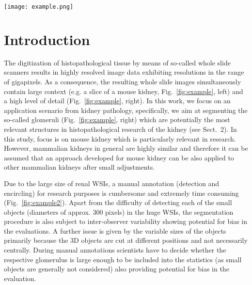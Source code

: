 \documentclass{elsarticle}
\begin{document}
\newcommand{\LINEWIDTH}{12cm}




\begin{figure*}[bth]
	\centering
	\texttt{[image: example.png]}
	\caption{Example WSI showing a complete mouse kidney (left) as well as magnified versions of a selected patch. The right patch exhibits one of the regions-of-interest, a so-called glomerulus.}
	\label{fig:example}
\end{figure*}




\section{Introduction}

	
The digitization of histopathological tissue by means of so-called whole slide scanners results in highly resolved image data exhibiting resolutions in the range of gigapixels. As a consequence, the resulting whole slide images simultaneously contain large context (e.g. a slice of a mouse kidney, Fig.~\ref{fig:example}, left) and a high level of detail (Fig.~\ref{fig:example}, right).
%
%
In this work, we focus on an application scenario
from kidney pathology, specifically, we aim at segmenting the so-called glomeruli (Fig.~\ref{fig:example}, right) which are potentially the most relevant structures in histopathological research of the kidney (see Sect.~2). In this study, focus is on mouse kidney which is particularly relevant in research. However, mammalian kidneys in general are highly similar and therefore it can be assumed that an approach developed for mouse kidney can be also applied to other mammalian kidneys after small adjustments.

Due to the large size of renal WSIs, a manual annotation (detection and encircling) for research purposes is cumbersome and extremely time consuming (Fig.~\ref{fig:example2}). Apart from the difficulty of detecting each of the small objects (diameters of approx. 300 pixels) in the huge WSIs, the segmentation procedure is also subject to inter-observer variability showing potential for bias in the evaluations. A further issue is given by the variable sizes of the objects primarily because the 3D objects are cut at different positions and not necessarily centrally. During manual annotations scientists have to decide whether the respective glomerulus is large enough to be included into the statistics (as small objects are generally not considered) also providing potential for bias in the evaluation.
\end{document}
